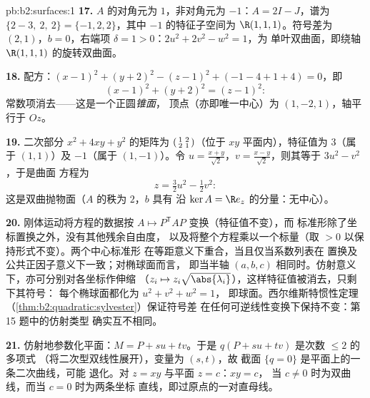 \begin{solution}{pb:b2:surfaces:1}
\textbf{17.} $A$ 的对角元为 $1$，非对角元为 $-1$：$A = 2I
- J$，谱为 $\{2 - 3,\ 2,\ 2\} = \{-1, 2, 2\}$，其中 $-1$
的特征子空间为 $\R(1,1,1)$。符号差为 $(2,1)$，$b = 0$，右端项
$\delta = 1 > 0$：$2u^2 + 2v^2 - w^2 = 1$，为
单叶双曲面，即绕轴 $\R(1,1,1)$ 的旋转双曲面。

\textbf{18.} 配方：$(x-1)^2 + (y+2)^2 - (z-1)^2 +
(-1 - 4 + 1 + 4) = 0$，即
\[
(x-1)^2 + (y+2)^2 = (z-1)^2 :
\]
常数项消去——这是一个正圆\emph{锥面}，
顶点（亦即唯一中心）为 $(1, -2, 1)$，轴平行于
$Oz$。

\textbf{19.} 二次部分 $x^2 + 4xy + y^2$ 的矩阵为
$\begin{psmallmatrix}1 & 2\\ 2 & 1\end{psmallmatrix}$（位于
$xy$ 平面内），特征值为 $3$（属于 $(1,1)$）及 $-1$（属于
$(1,-1)$）。令 $u = \frac{x+y}{\sqrt2}$，$v =
\frac{x-y}{\sqrt2}$，则其等于 $3u^2 - v^2$，于是曲面
方程为
\[
z = \tfrac32u^2 - \tfrac12v^2 :
\]
这是双曲抛物面（$A$ 的秩为 $2$，$b$ 具有
沿 $\ker A = \R e_z$ 的分量：无中心）。

\textbf{20.} 刚体运动将方程的数据按
$A \mapsto P^{\mathsf T}\!AP$ 变换（特征值不变），而
标准形除了坐标置换之外，没有其他残余自由度，
以及将整个方程乘以一个标量（取
$> 0$ 以保持形式不变）。两个中心标准形
在等距意义下重合，当且仅当系数列表在
置换及公共正因子意义下一致；对椭球面而言，
即当半轴 $(a, b, c)$ 相同时。仿射意义下，亦可分别对各坐标作伸缩
（$z_i \mapsto z_i\sqrt{\abs
{\lambda_i}}$），这样特征值被消去，只剩下其符号：
每个椭球面都化为 $u^2 + v^2 + w^2 = 1$，
即球面。西尔维斯特惯性定理
（\cref{thm:b2:quadratic:sylvester}）保证符号差
在任何可逆线性变换下保持不变：第 15 题中的仿射类型
确实互不相同。

\textbf{21.} 仿射地参数化平面：$M = P + su +
tv$。于是 $q(P + su + tv)$ 是次数 $\leq 2$ 的多项式
（将二次型双线性展开），变量为 $(s, t)$，故
截面 $\{q = 0\}$ 是平面上的一条二次曲线，可能
退化。对 $z = xy$ 与平面 $z = c$：$xy = c$，
当 $c \neq 0$ 时为双曲线，而当 $c = 0$ 时为两条坐标
直线，即过原点的一对直母线。


\end{solution}
